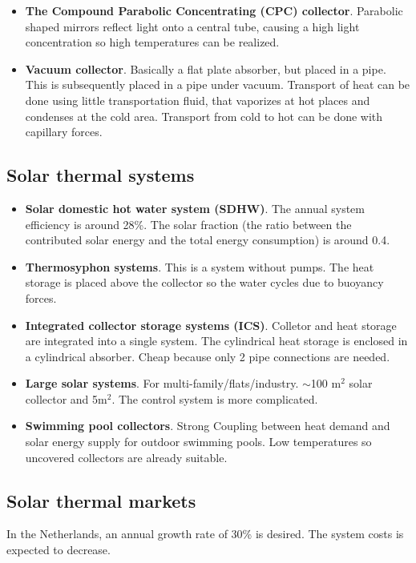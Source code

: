 \documentclass[a4paper,10pt]{article}
\begin{document}
\begin{itemize}
 \item \textbf{The Compound Parabolic Concentrating (CPC) collector}. Parabolic shaped mirrors reflect light onto a central tube, causing a high light concentration so high temperatures can be realized.
 \item \textbf{Vacuum collector}. Basically a flat plate absorber, but placed in a pipe. This is subsequently placed in a pipe under vacuum. Transport of heat can be done using little transportation fluid, that vaporizes at hot places and condenses at the cold area. Transport from cold to hot can be done with capillary forces.
\end{itemize}

\subsection{Solar thermal systems}
\begin{itemize}
\item \textbf{ Solar domestic hot water system (SDHW)}.
The annual system efficiency is around 28\%. The solar fraction (the ratio between the contributed solar energy and the total energy consumption) is around 0.4.

\item \textbf{ Thermosyphon systems}.
This is a system without pumps. The heat storage is placed above the collector so the water cycles due to buoyancy forces.

\item \textbf{ Integrated collector storage systems (ICS)}.
Colletor and heat storage are integrated into a single system. The cylindrical heat storage is enclosed in a cylindrical absorber. Cheap because only 2 pipe connections are needed.

\item \textbf{ Large solar systems}.
For multi-family/flats/industry. $\sim$100 m$^2$ solar collector and 5m$^2$. The control system is more complicated.

\item \textbf{ Swimming pool collectors}. Strong Coupling between heat demand and solar energy supply for outdoor swimming pools. Low temperatures so uncovered collectors are already suitable.
\end{itemize}

\subsection{Solar thermal markets}
In the Netherlands, an annual growth rate of 30\% is desired. The system costs is expected to decrease.
\end{document}
